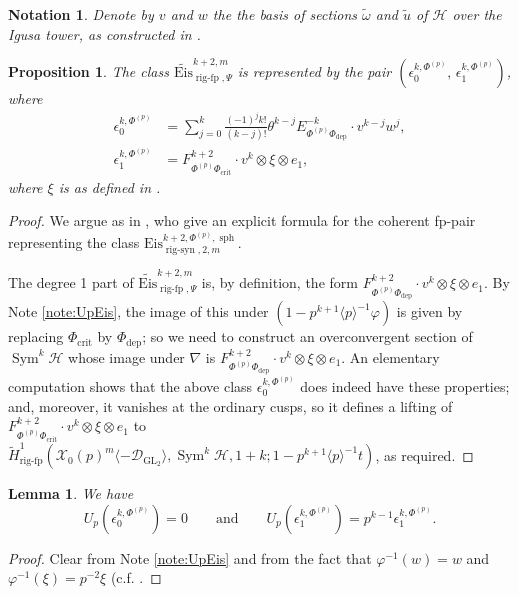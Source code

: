 \documentclass[cjm]{ipart}
\theoremstyle{plain}
\newtheorem{lemma}[theorem]{Lemma}
\newtheorem{proposition}[theorem]{Proposition}
\newtheorem{notation}[theorem]{Notation}
\theoremstyle{remark}
\DeclareMathOperator{\crit}{crit}
\DeclareMathOperator{\GL}{GL}
\DeclareMathOperator{\rigfp}{rig-fp}
\DeclareMathOperator{\rigsyn}{rig-syn}
\DeclareMathOperator{\sph}{sph}
\DeclareMathOperator{\Sym}{Sym}
\newcommand{\Eis}{\mathrm{Eis}}
\newcommand{\cD}{\mathcal{D}}
\newcommand{\cU}{\mathcal{U}}
\newcommand{\cX}{\mathcal{X}}
\newcommand{\dep}{\mathrm{dep}}
\newcommand{\sH}{\mathscr{H}}
\newcommand{\wH}{\widetilde{H}}
\numberwithin{equation}{subsection}
\renewcommand{\geq}{\geqslant}
\begin{document}
\begin{notation}
 Denote by $v$ and $w$ the  the basis of sections $\tilde{\omega}$ and $\tilde{u}$ of $\sH$ over the Igusa tower, as constructed in \cite[\S 4.5]{KLZ20}. %
\end{notation}



\begin{proposition}\label{prop:EisGL2cohpair}
 The class  $\widetilde{\Eis}_{\rigfp,\Psi}^{k+2,m}$ is represented by the pair $\left(\epsilon_0^{k,\Phi^{(p)}},\, \epsilon_1^{k,\Phi^{(p)}}\right)$, where
 \begin{align*}
  \epsilon_0^{k,\Phi^{(p)}} & = \sum_{j=0}^k \frac{(-1)^{j}k!}{(k-j)!} \theta^{k-j} E^{-k}_{\Phi^{(p)} \Phi_{\dep}}\cdot v^{k-j}w^{j},\\
  \epsilon_1^{k,\Phi^{(p)}} & =  F^{k+2}_{\Phi^{(p)} \Phi_{\crit}}\cdot v^k\otimes \xi\otimes e_1,
 \end{align*}
 where $\xi$ is as defined in \cite[\S 4.5]{KLZ20}.
\end{proposition}
\begin{proof}
 We argue as in \cite[Theorem 5.11]{bannaikings10}, who give an explicit formula for the coherent fp-pair representing the class $\Eis_{\rigsyn,{2,m}}^{k+2,\Phi^{(p)},\sph}$.

 The degree 1 part of  $\widetilde{\Eis}_{\rigfp,\Psi}^{k+2,m}$ is, by definition, the form $F^{k+2}_{\Phi^{(p)} \Phi_{\dep}}\cdot v^k\otimes \xi\otimes e_1$. By Note \ref{note:UpEis}, the image of this under $(1 - p^{k+1} \langle p \rangle^{-1} \varphi)$ is given by replacing $\Phi_{\crit}$ by $\Phi_{\mathrm{dep}}$; so we need to construct an overconvergent section of $\Sym^k \sH$ whose image under $\nabla$ is $F^{k+2}_{\Phi^{(p)} \Phi_{\dep}}\cdot v^k\otimes \xi\otimes e_1$. An elementary computation shows that the above class $\epsilon_0^{k,\Phi^{(p)}}$ does indeed have these properties; and, moreover, it vanishes at the ordinary cusps, so it defines a lifting of $F^{k+2}_{\Phi^{(p)} \Phi_{\crit}}\cdot v^k\otimes \xi\otimes e_1$ to $\wH^1_{\rigfp}(\cX_0(p)^{m}\langle -\cD_{\GL_2}\rangle, \Sym^k \sH, 1+k; 1-p^{k+1}\langle p \rangle^{-1} t)$, as required.
\end{proof}

\begin{lemma}\label{lem:UponEiscomp}
 We have
 \[ U_p\left(  \epsilon_0^{k,\Phi^{(p)}} \right)=0\qquad \text{and}\qquad U_p\left( \epsilon_1^{k,\Phi^{(p)}}\right)=p^{k-1} \epsilon_1^{k,\Phi^{(p)}}.\]
\end{lemma}
\begin{proof}
 Clear from Note \ref{note:UpEis} and from the fact that $\varphi^{-1}(w)=w$ and $\varphi^{-1}(\xi)=p^{-2}\xi$ (c.f. \cite[\S 5.4]{KLZ20}.
\end{proof}
\end{document}
